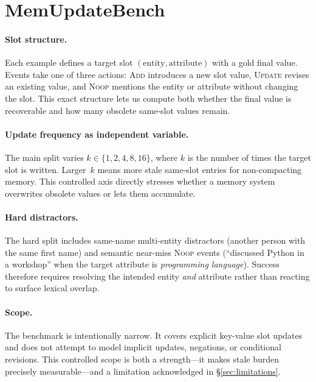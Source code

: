 \documentclass[11pt,twocolumn]{article}
\begin{document}
\section{MemUpdateBench}

\paragraph{Slot structure.}
Each example defines a target slot \((\text{entity}, \text{attribute})\) with a gold final value.
Events take one of three actions: \textsc{Add} introduces a new slot value, \textsc{Update} revises an existing value, and \textsc{Noop} mentions the entity or attribute without changing the slot.
This exact structure lets us compute both whether the final value is recoverable and how many obsolete same-slot values remain.

\paragraph{Update frequency as independent variable.}
The main split varies \(k \in \{1,2,4,8,16\}\), where \(k\) is the number of times the target slot is written.
Larger~\(k\) means more stale same-slot entries for non-compacting memory.
This controlled axis directly stresses whether a memory system overwrites obsolete values or lets them accumulate.

\paragraph{Hard distractors.}
The hard split includes same-name multi-entity distractors (another person with the same first name) and semantic near-miss \textsc{Noop} events (``discussed Python in a workshop'' when the target attribute is \emph{programming language}).
Success therefore requires resolving the intended entity \emph{and} attribute rather than reacting to surface lexical overlap.

\paragraph{Scope.}
The benchmark is intentionally narrow.
It covers explicit key-value slot updates and does not attempt to model implicit updates, negations, or conditional revisions.
This controlled scope is both a strength---it makes stale burden precisely measurable---and a limitation acknowledged in \S\ref{sec:limitations}.
\end{document}
